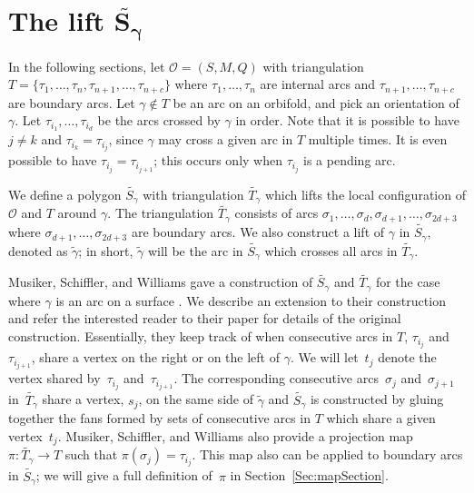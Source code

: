 \section[The lift $\widetilde{S_\gamma}$]{The lift $\boldsymbol{\widetilde{S_\gamma}}$}\label{sec:lift}

In the following sections, let $\mathcal{O} = (S,M,Q)$ with triangulation $T = \{ \tau_1,\ldots, \tau_n, \tau_{n+1},\ldots, \tau_{n+c}\}$ where $\tau_1,\ldots, \tau_n$ are internal arcs and $\tau_{n+1},\ldots, \tau_{n+c}$ are boundary arcs. Let $\gamma \notin T$ be an arc on an orbifold, and pick an orientation of $\gamma$. Let $\tau_{i_1},\ldots, \tau_{i_d}$ be the arcs crossed by $\gamma$ in order. Note that it is possible to have $j \neq k$ and $\tau_{i_k} = \tau_{i_j}$, since $\gamma$ may cross a given arc in $T$ multiple times. It is even possible to have $\tau_{i_j} = \tau_{i_{j+1}}$; this occurs only when $\tau_{i_j}$ is a pending arc.

We define a polygon $\widetilde{S_\gamma}$ with triangulation $\widetilde{T_\gamma}$ which lifts the local configuration of $\mathcal{O}$ and $T$ around $\gamma$. The triangulation $\widetilde{T_\gamma}$ consists of arcs $\sigma_1,\ldots, \sigma_d,\sigma_{d+1},\ldots, \sigma_{2d + 3}$ where $\sigma_{d+1},\ldots, \sigma_{2d + 3}$ are boundary arcs. We also construct a lift of $\gamma$ in $\widetilde{S_\gamma}$, denoted as $\widetilde{\gamma}$; in short, $\widetilde{\gamma}$ will be the arc in $\widetilde{S_\gamma}$ which crosses all arcs in $\widetilde{T_\gamma}$.

 Musiker, Schiffler, and Williams gave a construction of $\widetilde{S_\gamma}$ and $\widetilde{T_\gamma}$ for the case where $\gamma$ is an arc on a surface \cite{MSW}. We describe an extension to their construction and refer the interested reader to their paper for details of the original construction. Essentially, they keep track of when consecutive arcs in $T$, $\tau_{i_j}$ and $\tau_{i_{j+1}}$, share a vertex on the right or on the left of $\gamma$. We will let~$t_j$ denote the vertex shared by~$\tau_{i_j}$ and~$\tau_{i_{j+1}}$.
The corresponding consecutive arcs~$\sigma_j$ and~$\sigma_{j+1}$ in~$\widetilde{T_\gamma}$ share a vertex, $s_j$, on the same side of $\widetilde{\gamma}$ and $\widetilde{S_\gamma}$ is constructed by gluing together the fans formed by sets of consecutive arcs in $T$ which share a given vertex~$t_j$. Musiker, Schiffler, and Williams also provide a projection map $\pi\colon \widetilde{T_\gamma} \to T$ such that $\pi(\sigma_j) = \tau_{i_j}$. This map also can be applied to boundary arcs in $\widetilde{S_\gamma}$; we will give a full definition of~$\pi$ in Section~\ref{Sec:mapSection}.

